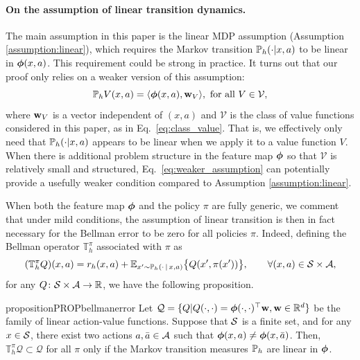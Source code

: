 \paragraph{On the assumption of linear transition dynamics.} The main assumption in this paper is the linear MDP assumption (Assumption \ref{assumption:linear}), which requires the Markov transition $\P_h(\cdot|x, a)$ to be linear in $\bphi(x, a)$. This requirement could be strong in practice. It turns out that our proof only relies on a weaker version of this assumption:
\begin{equation} \label{eq:weaker_assumption}
\P_h V(x, a) = \la \bphi(x, a), \w_{V}\ra, \text{~for all~} V\in\mathcal{V}, 
\end{equation}
where $\w_{V}$ is a vector independent of $(x, a)$ and $\mathcal{V}$ is the class of value functions considered in this paper, as in Eq.~\eqref{eq:class_value}. That is, we effectively only need that $\P_h(\cdot|x, a)$ appears to be linear when we apply it to a value function $V$.
When there is additional problem structure in the feature map $\bphi$ so that $\mathcal{V}$ is relatively small and structured, Eq.~\eqref{eq:weaker_assumption} can potentially provide a usefully weaker condition compared to Assumption \ref{assumption:linear}.

When both the feature map $\bphi$ and the policy $\pi$ are fully generic, we comment that under mild conditions, the assumption of linear transition is then in fact necessary for the Bellman error to be zero for all policies $\pi$.  Indeed, defining the Bellman operator $\mathbb{T}_h^{\pi}$ associated with $\pi$ as 
\begin{equation} \label{eq:stochastic_bellman}
(\mathbb{T}_h^{\pi} Q ) (x,a) = r_h(x,a) +\E_{x' \sim \P_h(\cdot \given x, a)}   \bigl\{  Q(x',  \pi(x') )  \bigl \} , \qquad \forall (x,a) \in \cS \times \cA,
\end{equation}
for any $Q \colon \cS \times \cA \rightarrow \R$, we have the following proposition.
\begin{restatable}{proposition}{PROPbellmanerror} Let $\mathcal{Q} = \{ Q | Q (\cdot, \cdot) = \bphi (\cdot, \cdot)^\top \w, \w\in \R^d \}$ be the family of linear action-value functions. Suppose that $\cS$ is a finite set, and for any $x \in \cS$, there exist two actions  $a , \bar a \in \cA$ such that $\bphi(x,a) \neq \bphi(x, \bar a)$.   
Then, $\mathbb{T}_h ^{\pi} \mathcal{Q} \subset \mathcal{Q}$ for all $\pi$ only if the Markov transition measures $\P_h$ are linear in $\bphi$. 
\end{restatable}


